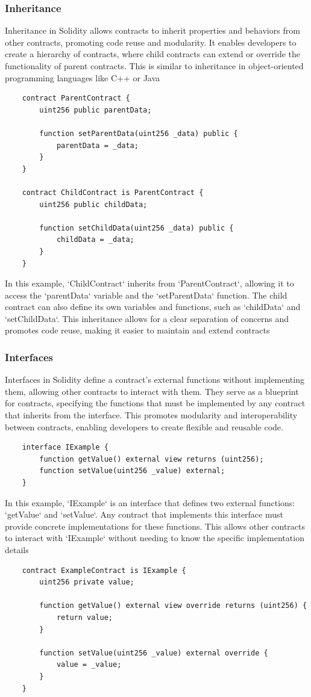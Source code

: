 \documentclass[12pt, a4paper]{article}
\begin{document}
\subsubsection{Inheritance}
Inheritance in Solidity allows contracts to inherit properties and behaviors from other contracts, promoting code reuse and modularity. It enables developers to create a hierarchy of contracts, where child contracts can extend or override the functionality of parent contracts. This is similar to inheritance in object-oriented programming languages like C++ or Java
\begin{verbatim}
    contract ParentContract {
        uint256 public parentData;

        function setParentData(uint256 _data) public {
            parentData = _data;
        }
    }

    contract ChildContract is ParentContract {
        uint256 public childData;

        function setChildData(uint256 _data) public {
            childData = _data;
        }
    }
\end{verbatim}
In this example, `ChildContract` inherits from `ParentContract`, allowing it to access the `parentData` variable and the `setParentData` function. The child contract can also define its own variables and functions, such as `childData` and `setChildData`. This inheritance allows for a clear separation of concerns and promotes code reuse, making it easier to maintain and extend contracts
\subsubsection{Interfaces}
Interfaces in Solidity define a contract's external functions without implementing them, allowing other contracts to interact with them. They serve as a blueprint for contracts, specifying the functions that must be implemented by any contract that inherits from the interface. This promotes modularity and interoperability between contracts, enabling developers to create flexible and reusable code.
\begin{verbatim}
    interface IExample {
        function getValue() external view returns (uint256);
        function setValue(uint256 _value) external;
    }   
\end{verbatim}
In this example, `IExample` is an interface that defines two external functions: `getValue` and `setValue`. Any contract that implements this interface must provide concrete implementations for these functions. This allows other contracts to interact with `IExample` without needing to know the specific implementation details
\begin{verbatim}
    contract ExampleContract is IExample {
        uint256 private value;

        function getValue() external view override returns (uint256) {
            return value;
        }

        function setValue(uint256 _value) external override {
            value = _value;
        }
    }
\end{verbatim}
\end{document}
